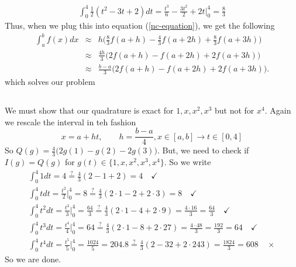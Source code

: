 \documentclass[12pt]{amsart}
\begin{document}
\begin{onehalfspace}
\begin{gather*}
            \int_0^4 \frac{1}{2}(t^2 - 3t + 2)dt = \frac{t^3}{6} - \frac{3t^2}{2} + 2t \bigg|_0^4 = \frac{8}{3}
        \end{gather*}
        Thus, when we plug this into equation (\ref{nc-equation}), we get the following
        \begin{eqnarray*}
            \int_a^b f(x)dx & \approx & h\bigg(\frac{8}{3}f(a+h) - \frac{4}{3}f(a+2h) + \frac{8}{3}f(a+3h)\bigg)\\
             & \approx & \frac{4h}{3}\bigg(2f(a+h) - f(a+2h) + 2f(a+3h)\bigg)\\
             & \approx & \frac{b-a}{3}\bigg(2f(a+h) - f(a+2h) + 2f(a+3h)\bigg).
        \end{eqnarray*}
        which solves our problem

        \subsection{}
        We must show that our quadrature is exact for $1,x,x^2,x^3$ but not for $x^4$.
        Again we rescale the interval in teh fashion
        \[
            x=a+ht,\qquad h=\frac{b-a}{4}, x\in[a,b]\rightarrow t\in[0,4]
        \]
        So $Q(g) = \frac{4}{3}\bigg(2g(1) - g(2) - 2g(3)\bigg)$.
        But, we need to check if $I(g)=Q(g)$ for $g(t)\in\{1,x,x^2,x^3,x^4\}$.
        So we write
        \begin{gather*}
            \int_0^4 1 dt = 4 \stackrel{?}{=} \frac{4}{3}(2 - 1 + 2) = 4 \quad\checkmark\\
            \int_0^4 t dt = \frac{t^2}{2}\bigg|_0^4 = 8 \stackrel{?}{=} \frac{4}{3}(2\cdot 1 - 2 + 2\cdot 3) = 8 \quad\checkmark\\
            \int_0^4 t^2 dt = \frac{t^3}{3}\bigg|_0^4 = \frac{64}{3} \stackrel{?}{=} \frac{4}{3}(2\cdot 1 - 4 + 2 \cdot 9) = \frac{4\cdot 16}{3} = \frac{64}{3}\quad\checkmark\\
            \int_0^4 t^3 dt = \frac{t^4}{4}\bigg|_0^4 = 64 \stackrel{?}{=} \frac{4}{3}(2\cdot 1 - 8 + 2\cdot 27) = \frac{4\cdot 48}{3} = \frac{192}{3} = 64\quad\checkmark\\
            \int_0^4 t^4 dt = \frac{t^5}{5}\bigg|_0^4 = \frac{1024}{5} = 204.8 \stackrel{?}{=} \frac{4}{3}(2-32+2\cdot 243)= \frac{1824}{3} = 608 \quad\times
        \end{gather*}
        So we are done.


\end{onehalfspace}
\end{document}
